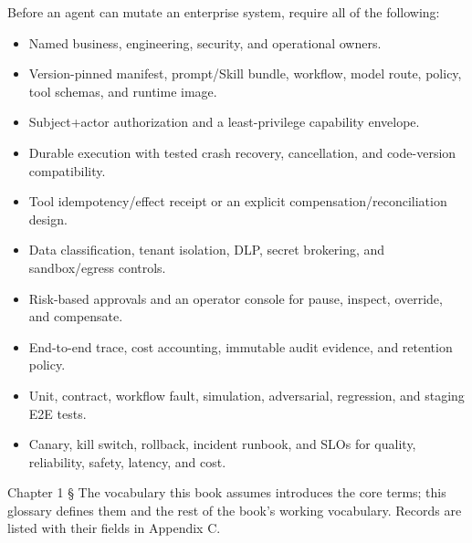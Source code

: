 Before an agent can mutate an enterprise system, require all of the following:\par

\begin{itemize}

\item Named business, engineering, security, and operational owners.

\item Version-pinned manifest, prompt/Skill bundle, workflow, model route, policy, tool schemas, and runtime image.

\item Subject+actor authorization and a least-privilege capability envelope.

\item Durable execution with tested crash recovery, cancellation, and code-version compatibility.

\item Tool idempotency/effect receipt or an explicit compensation/reconciliation design.

\item Data classification, tenant isolation, DLP, secret brokering, and sandbox/egress controls.

\item Risk-based approvals and an operator console for pause, inspect, override, and compensate.

\item End-to-end trace, cost accounting, immutable audit evidence, and retention policy.

\item Unit, contract, workflow fault, simulation, adversarial, regression, and staging E2E tests.

\item Canary, kill switch, rollback, incident runbook, and SLOs for quality, reliability, safety, latency, and cost.

\end{itemize}


Chapter 1 § The vocabulary this book assumes introduces the core terms; this glossary defines them and the rest of the book's working vocabulary. Records are listed with their fields in Appendix C.\par

